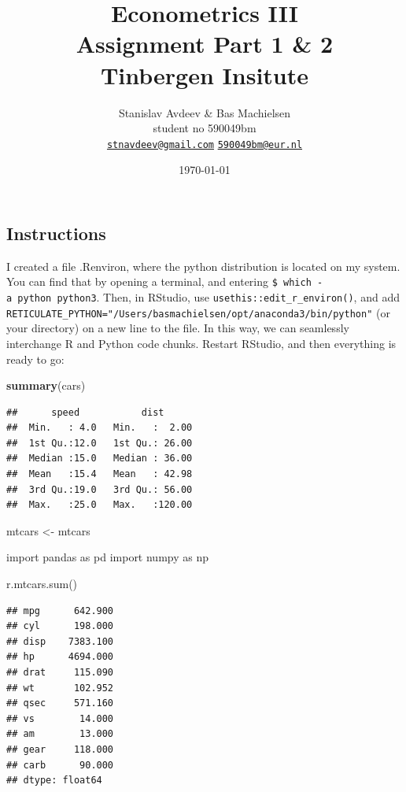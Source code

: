 \documentclass[
]{article}
\title{Econometrics III\\
Assignment Part 1 \& 2\\
Tinbergen Insitute}
\author{Stanislav Avdeev \& Bas Machielsen\\
student no \hspace{5m} 590049bm\\
\href{mailto:stnavdeev@gmail.com}{\nolinkurl{stnavdeev@gmail.com}}
\hspace{5m} \href{mailto:590049bm@eur.nl}{\nolinkurl{590049bm@eur.nl}}}
\date{\today}
\newenvironment{Shaded}{\begin{snugshade}}{\end{snugshade}}
\newcommand{\BuiltInTok}[1]{#1}
\newcommand{\ImportTok}[1]{#1}
\newcommand{\KeywordTok}[1]{\textcolor[rgb]{0.13,0.29,0.53}{\textbf{#1}}}
\newcommand{\NormalTok}[1]{#1}
\newcommand{\StringTok}[1]{\textcolor[rgb]{0.31,0.60,0.02}{#1}}
\begin{document}
\maketitle

\hypertarget{instructions}{%
\subsection{Instructions}\label{instructions}}

I created a file .Renviron, where the python distribution is located on
my system. You can find that by opening a terminal, and entering
\texttt{\$\ which\ -a\ python\ python3}. Then, in RStudio, use
\texttt{usethis::edit\_r\_environ()}, and add
\texttt{RETICULATE\_PYTHON="/Users/basmachielsen/opt/anaconda3/bin/python"}
(or your directory) on a new line to the file. In this way, we can
seamlessly interchange R and Python code chunks. Restart RStudio, and
then everything is ready to go:

\begin{Shaded}
\begin{Highlighting}[]
\KeywordTok{summary}\NormalTok{(cars)}
\end{Highlighting}
\end{Shaded}

\begin{verbatim}
##      speed           dist       
##  Min.   : 4.0   Min.   :  2.00  
##  1st Qu.:12.0   1st Qu.: 26.00  
##  Median :15.0   Median : 36.00  
##  Mean   :15.4   Mean   : 42.98  
##  3rd Qu.:19.0   3rd Qu.: 56.00  
##  Max.   :25.0   Max.   :120.00
\end{verbatim}

\begin{Shaded}
\begin{Highlighting}[]
\NormalTok{mtcars <-}\StringTok{ }\NormalTok{mtcars}
\end{Highlighting}
\end{Shaded}

\begin{Shaded}
\begin{Highlighting}[]
\ImportTok{import}\NormalTok{ pandas }\ImportTok{as}\NormalTok{ pd}
\ImportTok{import}\NormalTok{ numpy }\ImportTok{as}\NormalTok{ np}

\NormalTok{r.mtcars.}\BuiltInTok{sum}\NormalTok{()}
\end{Highlighting}
\end{Shaded}

\begin{verbatim}
## mpg      642.900
## cyl      198.000
## disp    7383.100
## hp      4694.000
## drat     115.090
## wt       102.952
## qsec     571.160
## vs        14.000
## am        13.000
## gear     118.000
## carb      90.000
## dtype: float64
\end{verbatim}
\end{document}
